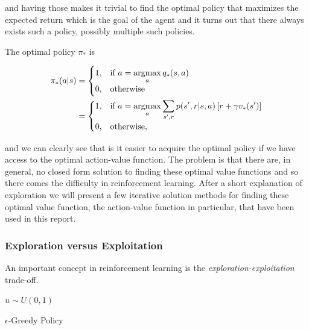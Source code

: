 \documentclass[result.tex]{subfiles}
\begin{document}
    and having those makes it trivial to find the optimal policy that maximizes the expected return which is the goal of the agent and it turns out that there always exists such a policy, possibly multiple such policies.

    The optimal policy $\pi_\ast$ is

    \begin{align*}
        \pi_\ast(a | s) &=
        \begin{cases}
            1, & \text{if}\ a = \displaystyle\operatorname*{argmax}_{a} q_\ast(s, a) \\
            0, & \text{otherwise}
        \end{cases} \\
        &=
        \begin{cases}
            1, & \text{if}\ a = \displaystyle\operatorname*{argmax}_{a} \sum_{s^\prime, r} p(s^\prime, r | s, a) \left[ r + \gamma v_\ast(s^\prime) \right] \\
            0, & \text{otherwise},
        \end{cases} \\
    \end{align*}

    and we can clearly see that is it easier to acquire the optimal policy if we have access to the optimal action-value function. The problem is that there are, in general, no closed form solution to finding these optimal value functions and so there comes the difficulty in reinforcement learning. After a short explanation of exploration we will present a few iterative solution methods for finding these optimal value function, the action-value function in particular, that have been used in this report.

    \subsubsection*{Exploration versus Exploitation}

    An important concept in reinforcement learning is the \textit{exploration-exploitation} trade-off.

    \begin{algorithm}[H]

        $u \sim U(0, 1)$ \\
        \caption{$\epsilon$-Greedy Policy}
    \end{algorithm}
\end{document}
